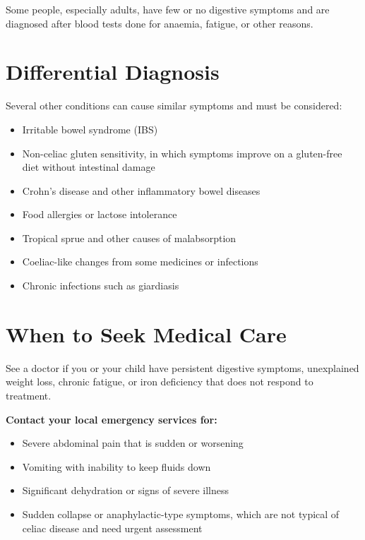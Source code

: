 Some people, especially adults, have few or no digestive symptoms and are diagnosed after blood tests done for anaemia, fatigue, or other reasons.

\section*{Differential Diagnosis}
Several other conditions can cause similar symptoms and must be considered:

\begin{itemize}
    \item Irritable bowel syndrome (IBS)
    \item Non-celiac gluten sensitivity, in which symptoms improve on a gluten-free diet without intestinal damage
    \item Crohn's disease and other inflammatory bowel diseases
    \item Food allergies or lactose intolerance
    \item Tropical sprue and other causes of malabsorption
    \item Coeliac-like changes from some medicines or infections
    \item Chronic infections such as giardiasis
\end{itemize}

\section*{When to Seek Medical Care}
See a doctor if you or your child have persistent digestive symptoms, unexplained weight loss, chronic fatigue, or iron deficiency that does not respond to treatment.

\textbf{Contact your local emergency services for:}
\begin{itemize}
    \item Severe abdominal pain that is sudden or worsening
    \item Vomiting with inability to keep fluids down
    \item Significant dehydration or signs of severe illness
    \item Sudden collapse or anaphylactic-type symptoms, which are not typical of celiac disease and need urgent assessment
\end{itemize}

